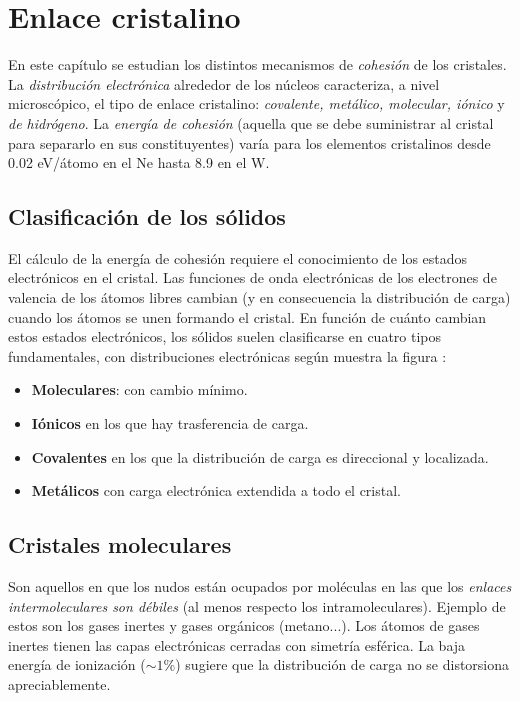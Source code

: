 \chapter{Enlace cristalino}

En este capítulo se estudian los distintos mecanismos de \textit{cohesión} de los cristales. La \textit{distribución electrónica} alrededor de los núcleos caracteriza, a nivel microscópico, el tipo de enlace cristalino: \textit{covalente, metálico, molecular, iónico} y \textit{de hidrógeno}. La \textit{energía de cohesión} (aquella que se debe suministrar al cristal para separarlo en sus constituyentes) varía para los elementos cristalinos desde 0.02 eV/átomo en el Ne hasta 8.9 en el W.

\section{Clasificación de los sólidos}

El cálculo de la energía de cohesión requiere el conocimiento de los estados electrónicos en el cristal. Las funciones de onda electrónicas de los electrones de valencia de los átomos libres cambian (y en consecuencia la distribución de carga) cuando los átomos se unen formando el cristal. En función de cuánto cambian estos estados electrónicos, los sólidos suelen clasificarse en cuatro tipos fundamentales, con distribuciones electrónicas según muestra la figura :

\begin{itemize}
    \item \textbf{Moleculares}: con cambio mínimo.
    \item \textbf{Iónicos} en los que hay trasferencia de carga.
    \item \textbf{Covalentes} en los que la distribución de carga es direccional y localizada.
    \item \textbf{Metálicos} con carga electrónica extendida a todo el cristal.
\end{itemize}

\section{Cristales moleculares}

Son aquellos en que los nudos están ocupados por moléculas en las que los \textit{enlaces intermoleculares son débiles} (al menos respecto los intramoleculares). Ejemplo de estos son los gases inertes y gases orgánicos (metano...). Los átomos de gases inertes tienen las capas electrónicas cerradas con simetría esférica. La baja energía de ionización ($\sim 1 \%$) sugiere que la distribución de carga no se distorsiona apreciablemente. 


